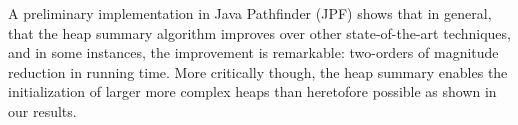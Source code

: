 
A preliminary implementation in Java Pathfinder (JPF) shows that in
general, that the heap summary algorithm improves over other
state-of-the-art techniques, and in some instances, the improvement is
remarkable: two-orders of magnitude reduction in running time. More
critically though, the heap summary enables the initialization of
larger more complex heaps than heretofore possible as shown in our
results.



\begin{comment}
We implement the summary heap algorithm as an extension to \emph{Java
  PathFinder} (JPF) and compare it to GSE with lazy initialization in
\emph{Symbolic Pathfinder (SPF)} and an implementation of lazier\#
initialization in SPF.  The comparison shows on some examples up to a two-order of magnitude
reduction in the total time taken to explore the same state space
defined by the bound on the longest heap reference chain.  For these
examples, we show that where other GSE approaches are unable to
complete exploration within the provided time bound, the summary heap
finishes exploration in a few seconds.
\end{comment}





